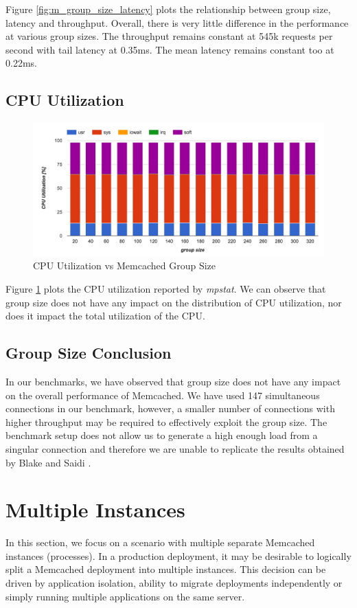 Figure \ref{fig:m_group_size_latency} plots the relationship between group size, latency and throughput. Overall, there is very little difference in the performance at various group sizes. The throughput remains constant at 545k requests per second with tail latency at 0.35ms. The mean latency remains constant too at 0.22ms.

\subsection{CPU Utilization}

\begin{figure}[h]
    \includegraphics[width=\textwidth]{./res2/m_group_size_cpu.png}
    \caption{CPU Utilization vs Memcached Group Size}
    \label{fig:m_group_size_cpu}
\end{figure}

Figure \ref{fig:m_group_size_cpu} plots the CPU utilization reported by \textit{mpstat}. We can observe that group size does not have any impact on the distribution of CPU utilization, nor does it impact the total utilization of the CPU.

\subsection{Group Size Conclusion}
In our benchmarks, we have observed that group size does not have any impact on the overall performance of Memcached. We have used 147 simultaneous connections in our benchmark, however, a smaller number of connections with higher throughput may be required to effectively exploit the group size. The benchmark setup does not allow us to generate a high enough load from a singular connection and therefore we are unable to replicate the results obtained by Blake and Saidi \cite{blake54does}.

\section{Multiple Instances}
In this section, we focus on a scenario with multiple separate Memcached instances (processes). In a production deployment, it may be desirable to logically split a Memcached deployment into multiple instances. This decision can be driven by application isolation, ability to migrate deployments independently or simply running multiple applications on the same server.

